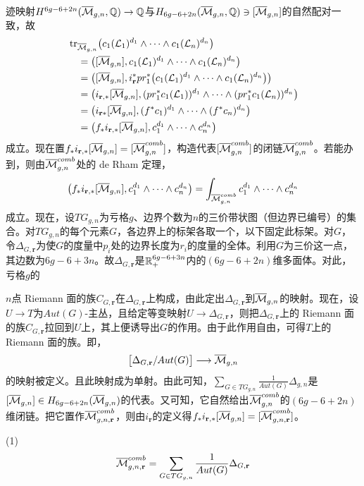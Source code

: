 迹映射$H^{6g-6+2n}(\overline{\mathcal{M}}_{g,n},\mathbb{Q})\to\mathbb{Q}$与$H_{6g-6+2n}(\overline{\mathcal{M}}_{g,n},\mathbb{Q})\ni[\overline{\mathcal{M}}_{g,n}]$的自然配对一致，故
\[
\begin{aligned}
&\operatorname{tr}_{\overline{\mathcal{M}}_{g,n}}\bigl(c_1(\mathcal{L}_1)^{d_1}\wedge\cdots\wedge c_1(\mathcal{L}_n)^{d_n}\bigr)\\
&\quad=\bigl([\overline{\mathcal{M}}_{g,n}],c_1(\mathcal{L}_1)^{d_1}\wedge\cdots\wedge c_1(\mathcal{L}_n)^{d_n}\bigr)\\
&\quad=\bigl([\overline{\mathcal{M}}_{g,n}],i_{\mathbf{r}}^*pr_1^*\bigl(c_1(\mathcal{L}_1)^{d_1}\wedge\cdots\wedge c_1(\mathcal{L}_n)^{d_n}\bigr)\bigr)\\
&\quad=\bigl(i_{\mathbf{r},*}[\overline{\mathcal{M}}_{g,n}],(pr_1^*c_1(\mathcal{L}_1))^{d_1}\wedge\cdots\wedge(pr_1^*c_1(\mathcal{L}_n))^{d_n}\bigr)\\
&\quad=\bigl(i_{\mathbf{r}*}[\overline{\mathcal{M}}_{g,n}],(f^*c_1)^{d_1}\wedge\cdots\wedge(f^*c_n)^{d_n}\bigr)\\
&\quad=\bigl(f_*i_{\mathbf{r},*}[\overline{\mathcal{M}}_{g,n}],c_1^{d_1}\wedge\cdots\wedge c_n^{d_n}\bigr)
\end{aligned}
\]
成立。现在置$f_*i_{\mathbf{r},*}[\overline{\mathcal{M}}_{g,n}]=[\overline{\mathcal{M}}^{comb}_{g,n}]$，构造代表$[\overline{\mathcal{M}}^{comb}_{g,n}]$的闭链$\overline{\mathcal{M}}^{comb}_{g,n}$。若能办到，则由$\overline{\mathcal{M}}^{comb}_{g,n}$处的 de Rham 定理，
\[
\bigl(f_*i_{\mathbf{r},*}[\overline{\mathcal{M}}_{g,n}],c_1^{d_1}\wedge\cdots\wedge c_n^{d_n}\bigr)
=\int_{\overline{\mathcal{M}}^{comb}_{g,n}}c_1^{d_1}\wedge\cdots\wedge c_n^{d_n}
\]
成立。现在，设$TG_{g,n}$为亏格$g$、边界个数为$n$的三价带状图（但边界已编号）的集合。对$TG_{g,n}$的每个元素$G$，各边界上的标架各取一个，以下固定此标架。对$G$，令$\Delta_{G,\mathbf{r}}$为使$G$的度量中$p_i$处的边界长度为$r_i$的度量的全体。利用$G$为三价这一点，其边数为$6g-6+3n$。故$\Delta_{G,\mathbf{r}}$是$\mathbb{R}_+^{6g-6+3n}$内的$(6g-6+2n)$维多面体。对此，亏格$g$的

$n$点 Riemann 面的族$C_{G,\mathbf{r}}$在$\Delta_{G,\mathbf{r}}$上构成，由此定出$\Delta_{G,\mathbf{r}}$到$\overline{\mathcal{M}}_{g,n}$的映射。现在，设$U\to T$为$Aut(G)$-主丛，且给定等变映射$U\to\Delta_{G,\mathbf{r}}$，则把$\Delta_{G,\mathbf{r}}$上的 Riemann 面的族$C_{G,\mathbf{r}}$拉回到$U$上，其上便诱导出$G$的作用。由于此作用自由，可得$T$上的 Riemann 面的族。即，
\[
\bigl[\Delta_{G,\mathbf{r}}/Aut(G)\bigr]\longrightarrow\overline{\mathcal{M}}_{g,n}
\]
的映射被定义。且此映射成为单射。由此可知，$\sum_{G\in TG_{g,n}}\frac{1}{Aut(G)}\Delta_{g,n}$是$[\overline{\mathcal{M}}_{g,n}]\in H_{6g-6+2n}(\overline{\mathcal{M}}_{g,n})$的代表。又可知，它自然给出$\overline{\mathcal{M}}^{comb}_{g,n}$的$(6g-6+2n)$维闭链。把它置作$\overline{\mathcal{M}}^{comb}_{g,n,\mathbf{r}}$，则由$i_{\mathbf{r}}$的定义得$f_*i_{\mathbf{r},*}[\overline{\mathcal{M}}_{g,n}]=[\overline{\mathcal{M}}^{comb}_{g,n,\mathbf{r}}]$。

(1)
\[
\overline{\mathcal{M}}^{comb}_{g,n,\mathbf{r}}=\sum_{G\in TG_{g,n}}\frac{1}{Aut(G)}\Delta_{G,\mathbf{r}}
\]

